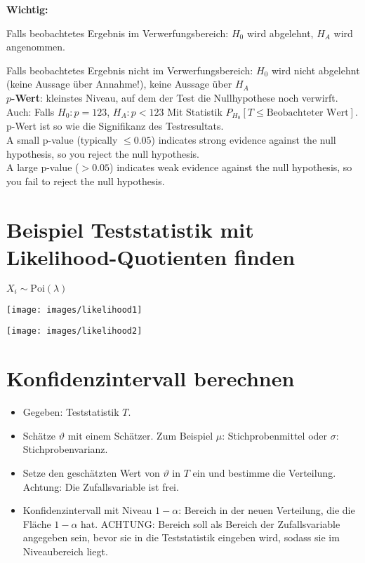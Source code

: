 \textbf{Wichtig:}

Falls beobachtetes Ergebnis im Verwerfungsbereich: $H_0$ wird abgelehnt, $H_A$ wird angenommen.

Falls beobachtetes Ergebnis nicht im Verwerfungsbereich: $H_0$ wird nicht abgelehnt (keine Aussage über Annahme!), keine Aussage über $H_A$\\

\textbf{$p$-Wert}: kleinstes Niveau, auf dem der Test die Nullhypothese noch verwirft.\\

Auch: Falls $H_0: p = 123$, $H_A: p < 123$ Mit Statistik $P_{H_0}[T\leq \text{Beobachteter Wert}]$. p-Wert ist so wie die Signifikanz des Testresultats.\\

A small p-value (typically $\leq 0.05$) indicates strong evidence against the null hypothesis, so you reject the null hypothesis.\\

A large p-value ($> 0.05$) indicates weak evidence against the null hypothesis, so you fail to reject the null hypothesis.

\section{Beispiel Teststatistik mit Likelihood-Quotienten finden}

$X_i \sim \text{Poi}(\lambda)$ 

\texttt{[image: images/likelihood1]}

\texttt{[image: images/likelihood2]}

\section{Konfidenzintervall berechnen}

\begin{itemize}
	\item Gegeben: Teststatistik $T$.
	\item Schätze $\vartheta$ mit einem Schätzer. Zum Beispiel $\mu$: Stichprobenmittel oder $\sigma$: Stichprobenvarianz.
	\item Setze den geschätzten Wert von $\vartheta$ in $T$ ein und bestimme die Verteilung. Achtung: Die Zufallsvariable ist frei. 
	\item Konfidenzintervall mit Niveau $1-\alpha$: Bereich in der neuen Verteilung, die die Fläche $1-\alpha$ hat. ACHTUNG: Bereich soll als Bereich der Zufallsvariable angegeben sein, bevor sie in die Teststatistik eingeben wird, sodass sie im Niveaubereich liegt.
\end{itemize}

